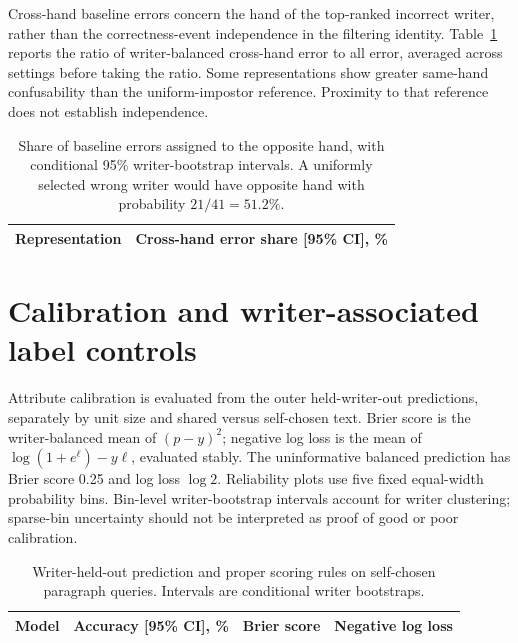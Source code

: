 \documentclass[10pt,a4paper]{article}
\begin{document}
Cross-hand baseline errors concern the hand of the top-ranked incorrect writer, rather than the correctness-event independence in the filtering identity. Table~\ref{tab:crosshand} reports the ratio of writer-balanced cross-hand error to all error, averaged across settings before taking the ratio. Some representations show greater same-hand confusability than the uniform-impostor reference. Proximity to that reference does not establish independence.

\begin{table}[ht]
\centering\small
\caption{Share of baseline errors assigned to the opposite hand, with conditional 95\% writer-bootstrap intervals. A uniformly selected wrong writer would have opposite hand with probability $21/41=51.2\%$.}\label{tab:crosshand}
\begin{tabular}{lr}\toprule
Representation & Cross-hand error share [95\% CI], \%\\\midrule

\end{tabular}
\end{table}

\section{Calibration and writer-associated label controls}
Attribute calibration is evaluated from the outer held-writer-out predictions, separately by unit size and shared versus self-chosen text. Brier score is the writer-balanced mean of $(p-y)^2$; negative log loss is the mean of $\log(1+e^\ell)-y\ell$, evaluated stably. The uninformative balanced prediction has Brier score 0.25 and log loss $\log2$. Reliability plots use five fixed equal-width probability bins. Bin-level writer-bootstrap intervals account for writer clustering; sparse-bin uncertainty should not be interpreted as proof of good or poor calibration.

\begin{table}[ht]
\centering\small
\caption{Writer-held-out prediction and proper scoring rules on self-chosen paragraph queries. Intervals are conditional writer bootstraps.}\label{tab:calibration}
\begin{tabular}{lrrr}\toprule
Model & Accuracy [95\% CI], \% & Brier score & Negative log loss\\\midrule

\end{tabular}
\end{table}
\end{document}
